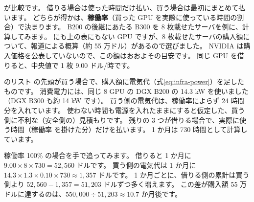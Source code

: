 が比較です。
借りる場合は使った時間だけ払い、買う場合は最初にまとめて払います。
どちらが得かは、\textbf{稼働率}（買った GPU を実際に使っている時間の割合）で決まります。
B200 の後継にあたる B300 を 8 枚載せたサーバを例に、計算してみます。
にも上の表にもない GPU ですが、8 枚載せたサーバの購入額について、報道による概算（約 55 万ドル）があるので選びました。
NVIDIA は購入価格を公表していないので、この額はおおよその目安です。
同じ GPU を借りると、中央値で 1 枚 9.00 ドル/時です。


のリスト  の先頭が買う場合で、購入額に電気代（式\eqref{eq:infra-power}）を足したものです。
消費電力には、同じ 8 GPU の DGX B200 の 14.3 kW を使いました（DGX B300 も約 14 kW です）。
買う側の電気代は、稼働率によらず 24 時間分を入れています。
使わない時間も電源を入れたままにすると仮定した、買う側に不利な（安全側の）見積もりです。
残りの 3 つが借りる場合で、実際に使う時間（稼働率  を掛けた分）だけを払います。
1 か月は 730 時間として計算しています。

稼働率 100\% の場合を手で追ってみます。
借りると 1 か月に $9.00\times8\times730=52{,}560$ ドルです。
買う側の電気代は 1 か月に $14.3\times1.3\times0.10\times730\approx1{,}357$ ドルです。
1 か月ごとに、借りる側の累計は買う側より $52{,}560-1{,}357=51{,}203$ ドルずつ多く増えます。
この差が購入額 55 万ドルに達するのは、$550{,}000\div51{,}203\approx10.7$ か月後です。

